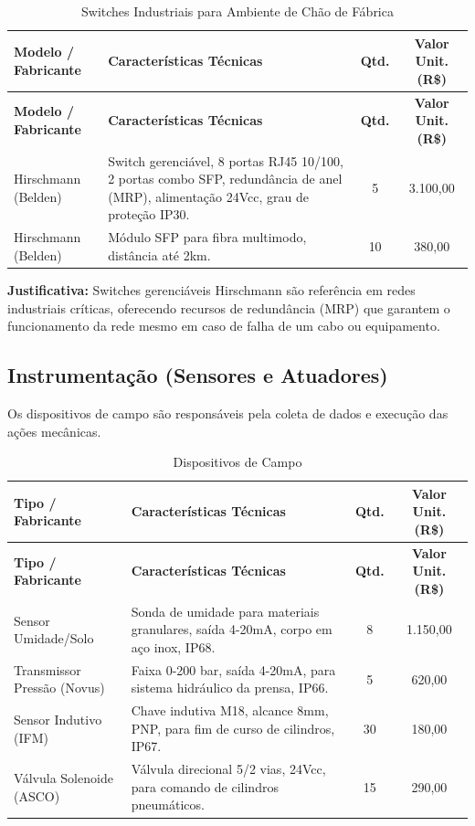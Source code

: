 \documentclass[12pt,a4paper]{article}
\begin{document}
\begin{longtable}{@{}p{3.5cm}|p{5cm}|c|c@{}}
\caption{Switches Industriais para Ambiente de Chão de Fábrica} \\
\toprule
\textbf{Modelo / Fabricante} & \textbf{Características Técnicas} & \textbf{Qtd.} & \textbf{Valor Unit. (R\$)} \\
\midrule
\endfirsthead
\toprule
\textbf{Modelo / Fabricante} & \textbf{Características Técnicas} & \textbf{Qtd.} & \textbf{Valor Unit. (R\$)} \\
\midrule
\endhead
\bottomrule
\endfoot
Hirschmann (Belden) & Switch gerenciável, 8 portas RJ45 10/100, 2 portas combo SFP, redundância de anel (MRP), alimentação 24Vcc, grau de proteção IP30. & 5 & 3.100,00 \\
\midrule
Hirschmann (Belden) & Módulo SFP para fibra multimodo, distância até 2km. & 10 & 380,00 \\
\bottomrule
\end{longtable}
\textbf{Justificativa:} Switches gerenciáveis Hirschmann são referência em redes industriais críticas, oferecendo recursos de redundância (MRP) que garantem o funcionamento da rede mesmo em caso de falha de um cabo ou equipamento.

\subsection{Instrumentação (Sensores e Atuadores)}
Os dispositivos de campo são responsáveis pela coleta de dados e execução das ações mecânicas.

\begin{longtable}{@{}p{3.5cm}|p{5cm}|c|c@{}}
\caption{Dispositivos de Campo} \\
\toprule
\textbf{Tipo / Fabricante} & \textbf{Características Técnicas} & \textbf{Qtd.} & \textbf{Valor Unit. (R\$)} \\
\midrule
\endfirsthead
\toprule
\textbf{Tipo / Fabricante} & \textbf{Características Técnicas} & \textbf{Qtd.} & \textbf{Valor Unit. (R\$)} \\
\midrule
\endhead
\bottomrule
\endfoot
Sensor Umidade/Solo & Sonda de umidade para materiais granulares, saída 4-20mA, corpo em aço inox, IP68. & 8 & 1.150,00 \\
\midrule
Transmissor Pressão (Novus) & Faixa 0-200 bar, saída 4-20mA, para sistema hidráulico da prensa, IP66. & 5 & 620,00 \\
\midrule
Sensor Indutivo (IFM) & Chave indutiva M18, alcance 8mm, PNP, para fim de curso de cilindros, IP67. & 30 & 180,00 \\
\midrule
Válvula Solenoide (ASCO) & Válvula direcional 5/2 vias, 24Vcc, para comando de cilindros pneumáticos. & 15 & 290,00 \\
\bottomrule
\end{longtable}
\end{document}
